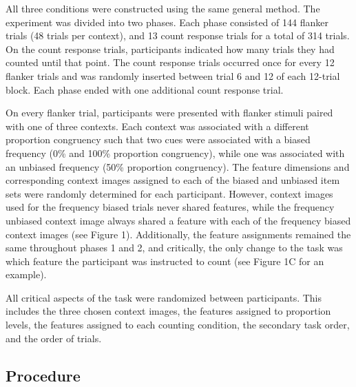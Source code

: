 \documentclass[english,,man,floatsintext]{apa6}
\begin{document}
All three conditions were constructed using the same general method. The experiment was divided into two phases. Each phase consisted of 144 flanker trials (48 trials per context), and 13 count response trials for a total of 314 trials. On the count response trials, participants indicated how many trials they had counted until that point. The count response trials occurred once for every 12 flanker trials and was randomly inserted between trial 6 and 12 of each 12-trial block. Each phase ended with one additional count response trial.

On every flanker trial, participants were presented with flanker stimuli paired with one of three contexts. Each context was associated with a different proportion congruency such that two cues were associated with a biased frequency (0\% and 100\% proportion congruency), while one was associated with an unbiased frequency (50\% proportion congruency). The feature dimensions and corresponding context images assigned to each of the biased and unbiased item sets were randomly determined for each participant. However, context images used for the frequency biased trials never shared features, while the frequency unbiased context image always shared a feature with each of the frequency biased context images (see Figure 1). Additionally, the feature assignments remained the same throughout phases 1 and 2, and critically, the only change to the task was which feature the participant was instructed to count (see Figure 1C for an example).

All critical aspects of the task were randomized between participants. This includes the three chosen context images, the features assigned to proportion levels, the features assigned to each counting condition, the secondary task order, and the order of trials.

\hypertarget{procedure}{%
\subsection{Procedure}\label{procedure}}
\end{document}
